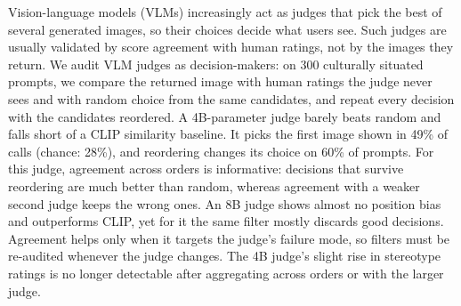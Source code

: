 Vision-language models (VLMs) increasingly act as judges that pick the best of several generated images, so their choices decide what users see. Such judges are usually validated by score agreement with human ratings, not by the images they return. We audit VLM judges as decision-makers: on 300 culturally situated prompts, we compare the returned image with human ratings the judge never sees and with random choice from the same candidates, and repeat every decision with the candidates reordered. A 4B-parameter judge barely beats random and falls short of a CLIP similarity baseline. It picks the first image shown in 49\% of calls (chance: 28\%), and reordering changes its choice on 60\% of prompts. For this judge, agreement across orders is informative: decisions that survive reordering are much better than random, whereas agreement with a weaker second judge keeps the wrong ones. An 8B judge shows almost no position bias and outperforms CLIP, yet for it the same filter mostly discards good decisions. Agreement helps only when it targets the judge's failure mode, so filters must be re-audited whenever the judge changes. The 4B judge's slight rise in stereotype ratings is no longer detectable after aggregating across orders or with the larger judge.
